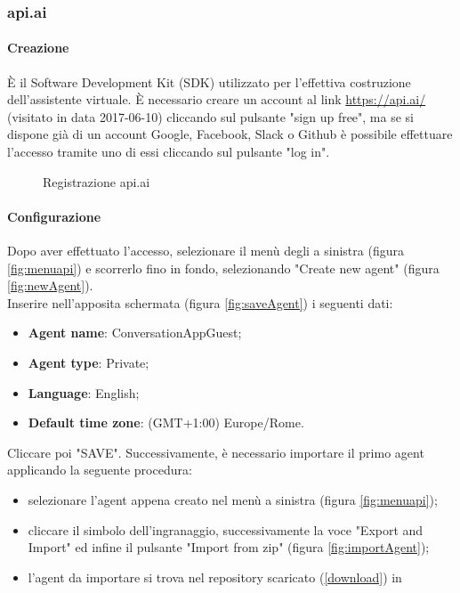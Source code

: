 \subsubsection{api.ai}\label{api}
\paragraph{Creazione}
È il Software Development Kit (SDK) utilizzato per l'effettiva costruzione dell'assistente virtuale.
È necessario creare un account al link \url{https://api.ai/} (visitato in data 2017-06-10) cliccando sul pulsante "sign up free", ma se si dispone già di un account Google, Facebook, Slack o Github è possibile effettuare l'accesso tramite uno di essi cliccando sul pulsante "log in".
\begin{figure}[h]
	\caption{Registrazione api.ai}
\end{figure}
\newpage
\paragraph{Configurazione}
Dopo aver effettuato l'accesso, selezionare il menù degli  a sinistra (figura \ref{fig:menuapi}) e scorrerlo fino in fondo, selezionando "Create new agent" (figura \ref{fig:newAgent}). \\

Inserire nell'apposita schermata (figura \ref{fig:saveAgent}) i seguenti dati:
\begin{itemize}
	\item \textbf{Agent name}: ConversationAppGuest;
	\item \textbf{Agent type}: Private;
	\item \textbf{Language}: English;
	\item \textbf{Default time zone}: (GMT+1:00) Europe/Rome.
\end{itemize}
Cliccare poi "SAVE".
Successivamente, è necessario importare il primo agent applicando la seguente procedura:
\begin{itemize}
	\item selezionare l'agent appena creato nel menù a sinistra (figura \ref{fig:menuapi});
	\item cliccare il simbolo dell'ingranaggio, successivamente la voce "Export and Import" ed infine il pulsante "Import from zip" (figura \ref{fig:importAgent});
	\item l'agent da importare si trova nel repository scaricato (\ref{download}) in\\ 
\end{itemize}


